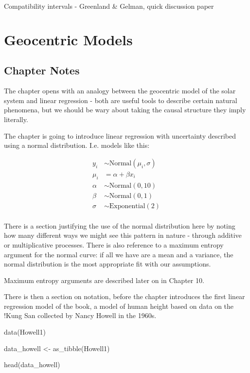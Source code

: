 \documentclass[
]{book}
\newenvironment{Shaded}{\begin{snugshade}}{\end{snugshade}}
\newcommand{\FunctionTok}[1]{\textcolor[rgb]{0.00,0.00,0.00}{#1}}
\newcommand{\NormalTok}[1]{#1}
\newcommand{\OtherTok}[1]{\textcolor[rgb]{0.56,0.35,0.01}{#1}}
\begin{document}
Compatibility intervals - Greenland \& Gelman, quick discussion paper

\hypertarget{geocentric}{%
\chapter{Geocentric Models}\label{geocentric}}

\hypertarget{chapter-notes-3}{%
\section{Chapter Notes}\label{chapter-notes-3}}

The chapter opens with an analogy between the geocentric model of the solar system and linear regression - both are useful tools to describe certain natural phenomena, but we should be wary about taking the causal structure they imply literally.

The chapter is going to introduce linear regression with uncertainty described using a normal distribution. I.e. models like this:

\[
\begin{aligned}
y_i &\sim \text{Normal}(\mu_i, \sigma) \\
\mu_i &= \alpha + \beta x_i \\
\alpha &\sim \text{Normal}(0, 10) \\ 
\beta &\sim \text{Normal}(0, 1) \\
\sigma &\sim \text{Exponential}(2) \\
\end{aligned}
\]

There is a section justifying the use of the normal distribution here by noting how many different ways we might see this pattern in nature - through additive or multiplicative processes. There is also reference to a maximum entropy argument for the normal curve: if all we have are a mean and a variance, the normal distribution is the most appropriate fit with our assumptions.

Maximum entropy arguments are described later on in Chapter 10.

There is then a section on notation, before the chapter introduces the first linear regression model of the book, a model of human height based on data on the !Kung San collected by Nancy Howell in the 1960s.

\begin{Shaded}
\begin{Highlighting}[]
\FunctionTok{data}\NormalTok{(Howell1) }

\NormalTok{data\_howell }\OtherTok{\textless{}{-}} \FunctionTok{as\_tibble}\NormalTok{(Howell1)}

\FunctionTok{head}\NormalTok{(data\_howell)}
\end{Highlighting}
\end{Shaded}
\end{document}
